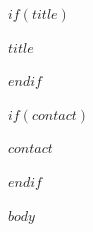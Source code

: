 \documentclass[11pt,a4paper]{article}
\begin{document}
$if(title)$
\begin{center}
{\Huge \textbf{$title$}}
\end{center}
$endif$

$if(contact)$
\begin{center}
$contact$
\end{center}
$endif$

$body$
\end{document}
